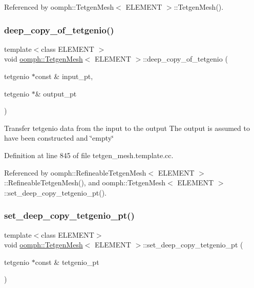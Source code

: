 Referenced by oomph\+::\+Tetgen\+Mesh$<$ E\+L\+E\+M\+E\+N\+T $>$\+::\+Tetgen\+Mesh().

\mbox{\label{classoomph_1_1TetgenMesh_a93e764a63a21a93d4a2548058eb1a7c4}} 
\subsubsection{\texorpdfstring{deep\+\_\+copy\+\_\+of\+\_\+tetgenio()}{deep\_copy\_of\_tetgenio()}}
{\footnotesize\ttfamily template$<$class E\+L\+E\+M\+E\+NT $>$ \\
void \hyperlink{classoomph_1_1TetgenMesh}{oomph\+::\+Tetgen\+Mesh}$<$ E\+L\+E\+M\+E\+NT $>$\+::deep\+\_\+copy\+\_\+of\+\_\+tetgenio (\begin{DoxyParamCaption}\item[{tetgenio $\ast$const \&}]{input\+\_\+pt,  }\item[{tetgenio $\ast$\&}]{output\+\_\+pt }\end{DoxyParamCaption})}

Transfer tetgenio data from the input to the output The output is assumed to have been constructed and \char`\"{}empty\char`\"{} 

Definition at line 845 of file tetgen\+\_\+mesh.\+template.\+cc.



Referenced by oomph\+::\+Refineable\+Tetgen\+Mesh$<$ E\+L\+E\+M\+E\+N\+T $>$\+::\+Refineable\+Tetgen\+Mesh(), and oomph\+::\+Tetgen\+Mesh$<$ E\+L\+E\+M\+E\+N\+T $>$\+::set\+\_\+deep\+\_\+copy\+\_\+tetgenio\+\_\+pt().

\mbox{\label{classoomph_1_1TetgenMesh_a8758320eb646d20b578414c35145f0d7}} 
\subsubsection{\texorpdfstring{set\+\_\+deep\+\_\+copy\+\_\+tetgenio\+\_\+pt()}{set\_deep\_copy\_tetgenio\_pt()}}
{\footnotesize\ttfamily template$<$class E\+L\+E\+M\+E\+NT$>$ \\
void \hyperlink{classoomph_1_1TetgenMesh}{oomph\+::\+Tetgen\+Mesh}$<$ E\+L\+E\+M\+E\+NT $>$\+::set\+\_\+deep\+\_\+copy\+\_\+tetgenio\+\_\+pt (\begin{DoxyParamCaption}\item[{tetgenio $\ast$const \&}]{tetgenio\+\_\+pt }\end{DoxyParamCaption})\hspace{0.3cm}{\ttfamily [inline]}}



